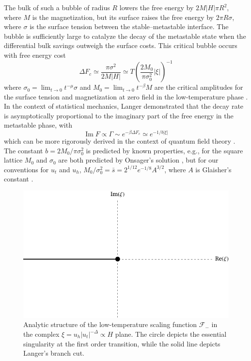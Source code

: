 \documentclass[
aps,
pre,
preprint,
longbibliography,
floatfix
]{revtex4-2}
\begin{document}
The bulk of such a bubble of radius $R$ lowers the free energy by $2M|H|\pi
R^2$, where  $M$ is the magnetization, but its surface raises the free energy
by $2\pi R\sigma$, where $\sigma$ is the surface tension between the
stable--metastable interface. The bubble is sufficiently large to catalyze the decay of the
metastable state when the differential bulk savings outweigh the surface costs.
This critical bubble occurs with free energy cost
\begin{equation}
  \Delta F_c
    \simeq\frac{\pi\sigma^2}{2M|H|}
    \simeq T\left(\frac{2M_0}{\pi\sigma_0^2}|\xi|\right)^{-1}
\end{equation}
where $\sigma_0=\lim_{t\to0}t^{-\mu}\sigma$ and $M_0=\lim_{t\to0}t^{-\beta}M$
are the critical amplitudes for the surface tension and magnetization at zero
field in the low-temperature phase \cite{Kent-Dobias_2020_Novel}.  In the
context of statistical mechanics, Langer demonstrated that the decay rate is
asymptotically proportional to the imaginary part of the free energy in the
metastable phase, with
\begin{equation}
  \operatorname{Im}F\propto\Gamma\sim e^{-\beta\Delta F_c}\simeq e^{-1/b|\xi|}
\end{equation}
which can be more rigorously derived in the context of quantum field theory
\cite{Voloshin_1985_Decay}. The constant $b=2M_0/\pi\sigma_0^2$ is predicted by
known properties, e.g., for the square lattice $M_0$ and $\sigma_0$ are both
predicted by Onsager's solution \cite{Onsager_1944_Crystal}, but for our
conventions for $u_t$ and $u_h$, $M_0/\sigma_0^2=\bar
s=2^{1/12}e^{-1/8}A^{3/2}$, where $A$ is Glaisher's constant
\cite{Fonseca_2003_Ising}.


\begin{figure}
  \includegraphics{figs/F_lower_singularities.pdf}
  \caption{
    Analytic structure of the low-temperature scaling function $\mathcal F_-$
    in the complex $\xi=u_h|u_t|^{-\Delta}\propto H$ plane. The circle
    depicts the essential singularity at the first order transition, while the
    solid line depicts Langer's branch cut.
  } \label{fig:lower.singularities}
\end{figure}
\end{document}
